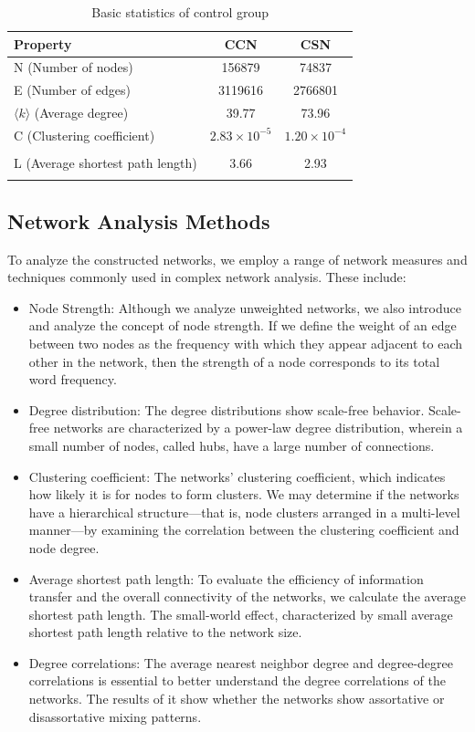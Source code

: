 \documentclass[11pt]{article}
\begin{document}
\begin{table}[htbp]
    \centering
    \caption{Basic statistics of control group}
    \label{tab:control_group_stats}
    \begin{tabular}{|p{6cm}|c|c|}
        \hline
        \toprule
        Property & {CCN} & {CSN} \\
        \midrule
        N (Number of nodes) & 156879 & 74837 \\
        E (Number of edges) & 3119616 & 2766801 \\
        $\langle k \rangle$ (Average degree) & 39.77 & 73.96 \\
        C (Clustering coefficient) & $2.83 \times 10^{-5}$ & $1.20 \times 10^{-4}$ \\\\
        L (Average shortest path length) & 3.66 & 2.93 \\\\
        \bottomrule
    \end{tabular}
\end{table}
\subsection{Network Analysis Methods}
To analyze the constructed networks, we employ a range of network measures and techniques commonly used in complex network analysis. These include:

\begin{itemize}
    \item Node Strength: Although we analyze unweighted networks, we also introduce and analyze the concept of node strength. If we define the weight of an edge between two nodes as the frequency with which they appear adjacent to each other in the network, then the strength of a node corresponds to its total word frequency.
    \item Degree distribution: The degree distributions show scale-free behavior. Scale-free networks are characterized by a power-law degree distribution, wherein a small number of nodes, called hubs, have a large number of connections. 
    \item Clustering coefficient: The networks' clustering coefficient, which indicates how likely it is for nodes to form clusters. We may determine if the networks have a hierarchical structure—that is, node clusters arranged in a multi-level manner—by examining the correlation between the clustering coefficient and node degree. 
    \item Average shortest path length: To evaluate the efficiency of information transfer and the overall connectivity of the networks, we calculate the average shortest path length. The small-world effect, characterized by small average shortest path length relative to the network size. 
    \item Degree correlations: The average nearest neighbor degree and degree-degree correlations is essential to better understand the degree correlations of the networks. The results of it show whether the networks show assortative or disassortative mixing patterns. 
\end{itemize}
    
\end{document}
